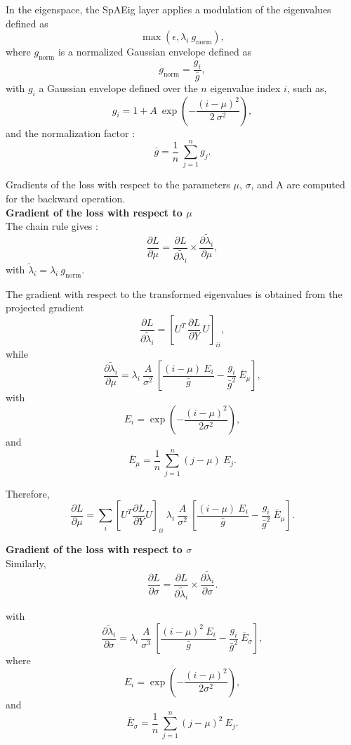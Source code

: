 \documentclass[11pt,a4paper]{article}
\begin{document}
In the eigenspace, the SpAEig layer applies a modulation of the eigenvalues defined as \[  \max(\epsilon, \lambda_i \: g_{\text{norm}}),\] 
where $ g_{\text{norm}}$ is a normalized Gaussian envelope defined as \[ g_{\text{norm}} = \frac{g_i}{\bar{g}} ,\]  
with $g_i$ a Gaussian envelope defined over the $n$ eigenvalue index $i$, such as, \[ g_i = 1 + A\: \exp(- \frac{(i-\mu)^2}{2\: \sigma^2}), \]  and the normalization factor :\[\bar{g} = \frac{1}{n} \: \sum_{j=1}^{n} g_j .\]

\noindent Gradients of the loss with respect to the parameters $\mu$, $\sigma$, and A are computed for the backward operation. \\

\noindent \textbf{Gradient of the loss with respect to $\mu$ } \\
The chain rule gives : 
\[ \frac{\partial L}{\partial \mu} = \frac{\partial L}{\partial  \tilde{\lambda}_i } \times \frac{\partial  \tilde{\lambda}_i }{\partial \mu},\] with $ \tilde{\lambda}_i = \lambda_i \: g_{\text{norm}} .$

\noindent The gradient with respect to the transformed eigenvalues is obtained from the projected gradient \[\frac{\partial L}{\partial \tilde{\lambda}_i}=  [U^T\, \frac{\partial L}{\partial Y}\,U]_{ii},\] while \[\frac{\partial \tilde{\lambda}_i}{\partial \mu} = \lambda_i \: \frac{A}{\sigma^2} \: \left[ \frac{(i-\mu)\: E_i}{\bar{g}} - \frac{g_i}{\bar{g}^2} \: \bar{E}_{\mu} \right],\] with \[ E_i = \exp(-\frac{(i-\mu)^2}{2\sigma^2}),\] and  \[\bar{E}_{\mu} = \frac{1}{n} \: \sum_{j=1}^{n} (j-\mu) \: E_j .\]

\noindent Therefore, 
\[ \frac{\partial L}{\partial \mu} = \sum_i \left[ U^T \frac{\partial L}{\partial Y} U\right]_{ii} \: \lambda_i \: \frac{A}{\sigma^2} \: \left[ \frac{(i-\mu)\: E_i}{\bar{g}} - \frac{g_i}{\bar{g}^2} \: \bar{E}_{\mu} \right]. \]

\noindent \textbf{Gradient of the loss with respect to $\sigma$ } \\
Similarly,  
\[ \frac{\partial L}{\partial \sigma} = \frac{\partial L}{\partial  \tilde{\lambda}_i } \times \frac{\partial  \tilde{\lambda}_i }{\partial \sigma} .\]

with \[\frac{\partial \tilde{\lambda}_i}{\partial \sigma} = \lambda_i \: \frac{A}{\sigma^3} \: \left[ \frac{(i-\mu)^2\: E_i}{\bar{g}} - \frac{g_i}{\bar{g}^2} \: \bar{E}_{\sigma} \right] ,\] where \[ E_i = \exp(-\frac{(i-\mu)^2}{2\sigma^2}),\] and  \[\bar{E}_{\sigma} = \frac{1}{n} \: \sum_{j=1}^{n} (j-\mu)^2 \: E_j .\]
\end{document}
